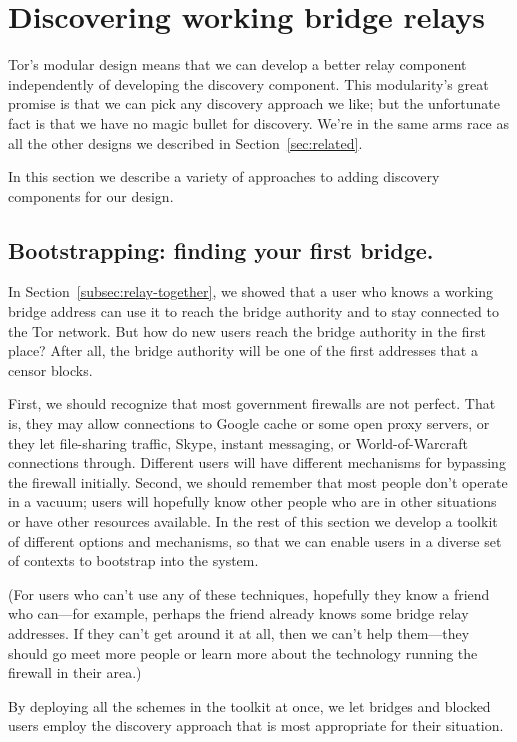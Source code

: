 \documentclass{llncs}
\begin{document}
\section{Discovering working bridge relays}
\label{sec:discovery}

Tor's modular design means that we can develop a better relay component
independently of developing the discovery component. This modularity's
great promise is that we can pick any discovery approach we like; but the
unfortunate fact is that we have no magic bullet for discovery. We're
in the same arms race as all the other designs we described in
Section~\ref{sec:related}.

In this section we describe a variety of approaches to adding discovery
components for our design.

\subsection{Bootstrapping: finding your first bridge.}
\label{subsec:first-bridge}

In Section~\ref{subsec:relay-together}, we showed that a user who knows
a working bridge address can use it to reach the bridge authority and
to stay connected to the Tor network. But how do new users reach the
bridge authority in the first place? After all, the bridge authority
will be one of the first addresses that a censor blocks.

First, we should recognize that most government firewalls are not
perfect. That is, they may allow connections to Google cache or some
open proxy servers, or they let file-sharing traffic, Skype, instant
messaging, or World-of-Warcraft connections through. Different users will
have different mechanisms for bypassing the firewall initially. Second,
we should remember that most people don't operate in a vacuum; users will
hopefully know other people who are in other situations or have other
resources available. In the rest of this section we develop a toolkit
of different options and mechanisms, so that we can enable users in a
diverse set of contexts to bootstrap into the system.

(For users who can't use any of these techniques, hopefully they know
a friend who can---for example, perhaps the friend already knows some
bridge relay addresses. If they can't get around it at all, then we
can't help them---they should go meet more people or learn more about
the technology running the firewall in their area.)

By deploying all the schemes in the toolkit at once, we let bridges and
blocked users employ the discovery approach that is most appropriate
for their situation.
\end{document}
